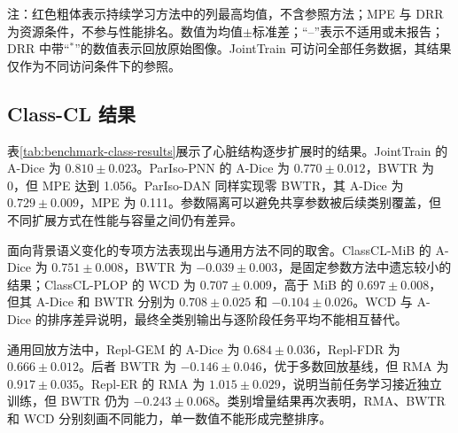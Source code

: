 \begin{table}[htbp]
\vspace{2pt}
\begin{minipage}{0.98\textwidth}
\footnotesize 注：红色粗体表示持续学习方法中的列最高均值，不含参照方法；MPE 与 DRR 为资源条件，不参与性能排名。数值为均值$\pm$标准差；“--”表示不适用或未报告；DRR 中带“$^{*}$”的数值表示回放原始图像。JointTrain 可访问全部任务数据，其结果仅作为不同访问条件下的参照。
\end{minipage}
\end{table}

\subsection*{Class-CL 结果}

表\ref{tab:benchmark-class-results}展示了心脏结构逐步扩展时的结果。JointTrain 的 A-Dice 为 $0.810\pm0.023$。ParIso-PNN 的 A-Dice 为 $0.770\pm0.012$，BWTR 为 0，但 MPE 达到 1.056。ParIso-DAN 同样实现零 BWTR，其 A-Dice 为 $0.729\pm0.009$，MPE 为 0.111。参数隔离可以避免共享参数被后续类别覆盖，但不同扩展方式在性能与容量之间仍有差异。

面向背景语义变化的专项方法表现出与通用方法不同的取舍。ClassCL-MiB 的 A-Dice 为 $0.751\pm0.008$，BWTR 为 $-0.039\pm0.003$，是固定参数方法中遗忘较小的结果；ClassCL-PLOP 的 WCD 为 $0.707\pm0.009$，高于 MiB 的 $0.697\pm0.008$，但其 A-Dice 和 BWTR 分别为 $0.708\pm0.025$ 和 $-0.104\pm0.026$。WCD 与 A-Dice 的排序差异说明，最终全类别输出与逐阶段任务平均不能相互替代。

通用回放方法中，Repl-GEM 的 A-Dice 为 $0.684\pm0.036$，Repl-FDR 为 $0.666\pm0.012$。后者 BWTR 为 $-0.146\pm0.046$，优于多数回放基线，但 RMA 为 $0.917\pm0.035$。Repl-ER 的 RMA 为 $1.015\pm0.029$，说明当前任务学习接近独立训练，但 BWTR 仍为 $-0.243\pm0.068$。类别增量结果再次表明，RMA、BWTR 和 WCD 分别刻画不同能力，单一数值不能形成完整排序。

